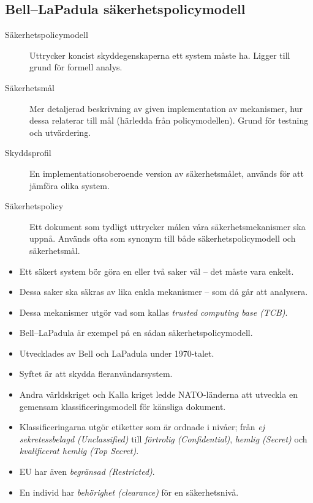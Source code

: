 \subsection{Bell--LaPadula säkerhetspolicymodell}
\begin{frame}{\insertsubsectionhead}
  \begin{description}
    \item[Säkerhetspolicymodell] Uttrycker koncist skyddegenskaperna ett system 
      måste ha.
      Ligger till grund för formell analys.
    \item[Säkerhetsmål] Mer detaljerad beskrivning av given implementation av 
      mekanismer, hur dessa relaterar till mål (härledda från policymodellen).
      Grund för testning och utvärdering.
    \item[Skyddsprofil] En implementationsoberoende version av säkerhetsmålet, 
      används för att jämföra olika system.
    \item[Säkerhetspolicy] Ett dokument som tydligt uttrycker målen våra 
      säkerhetsmekanismer ska uppnå.
      Används ofta som synonym till både säkerhetspolicymodell och 
      säkerhetsmål.
  \end{description}
\end{frame}
\begin{frame}{\insertsubsectionhead}
  \begin{itemize}
    \item Ett säkert system bör göra en eller två saker väl -- det måste vara 
      enkelt.
    \item Dessa saker ska säkras av lika enkla mekanismer -- som då går att 
      analysera.
    \item Dessa mekanismer utgör vad som kallas \emph{trusted computing base 
      (TCB)}.
    \item Bell--LaPadula är exempel på en sådan säkerhetspolicymodell.
    \item Utvecklades av Bell och LaPadula under 1970-talet.
    \item Syftet är att skydda fleranvändarsystem.
  \end{itemize}
\end{frame}
\begin{frame}{\insertsubsectionhead}
  \begin{itemize}
    \item Andra världskriget och Kalla kriget ledde NATO-länderna att utveckla 
      en gemensam klassificeringsmodell för känsliga dokument.
    \item Klassificeringarna utgör etiketter som är ordnade i nivåer; från 
      \emph{ej sekretessbelagd (Unclassified)} till \emph{förtrolig 
      (Confidential)}, \emph{hemlig (Secret)} och \emph{kvalificerat hemlig 
      (Top Secret)}.
    \item EU har även \emph{begränsad (Restricted)}.
    \item En individ har \emph{behörighet (clearance)} för en säkerhetsnivå.
  \end{itemize}
\end{frame}
